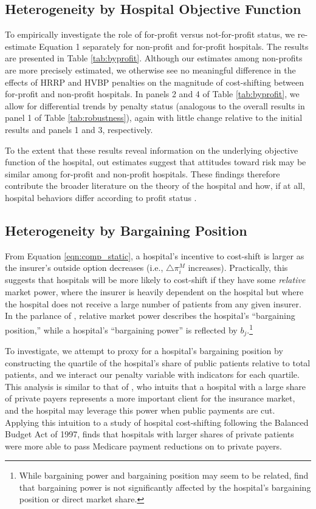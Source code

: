 \documentclass[12pt]{article}
\begin{document}
\subsection{Heterogeneity by Hospital Objective Function}
To empirically investigate the role of for-profit versus not-for-profit status, we re-estimate Equation 1 separately for non-profit and for-profit hospitals.  The results are presented in Table \ref{tab:byprofit}. Although our estimates among non-profits are more precisely estimated, we otherwise see no meaningful difference in the effects of HRRP and HVBP penalties on the magnitude of cost-shifting between for-profit and non-profit hospitals. In panels 2 and 4 of Table \ref{tab:byprofit}, we allow for differential trends by penalty status (analogous to the overall results in panel 1 of Table \ref{tab:robustness}), again with little change relative to the initial results and panels 1 and 3, respectively.

To the extent that these results reveal information on the underlying objective function of the hospital, out estimates suggest that attitudes toward risk may be similar among for-profit and non-profit hospitals. These findings therefore contribute the broader literature on the theory of the hospital and how, if at all, hospital behaviors differ according to profit status \citep{sloan2001,duggan2002,horwitz2005,horwitz2009,david2009}.

\subsection{Heterogeneity by Bargaining Position}
From Equation \ref{eqn:comp_static}, a hospital's incentive to cost-shift is larger as the insurer's outside option decreases (i.e., $\triangle \pi_{i}^{M}$ increases). Practically, this suggests that hospitals will be more likely to cost-shift if they have some \textit{relative} market power, where the insurer is heavily dependent on the hospital but where the hospital does not receive a large number of patients from any given insurer. In the parlance of \cite{lewis2015}, relative market power describes the hospital's ``bargaining position,'' while a hospital's ``bargaining power'' is reflected by $b_{j}$.\footnote{While bargaining power and bargaining position may seem to be related, \cite{lewis2015} find that bargaining power is not significantly affected by the hospital's bargaining position or direct market share.}

To investigate, we attempt to proxy for a hospital's bargaining position by constructing the quartile of the hospital's share of public patients relative to total patients, and we interact our penalty variable with indicators for each quartile. This analysis is similar to that of \cite{wu2010}, who intuits that a hospital with a large share of private payers represents a more important client for the insurance market, and the hospital may leverage this power when public payments are cut. Applying this intuition to a study of hospital cost-shifting following the Balanced Budget Act of 1997, \cite{wu2010} finds that hospitals with larger shares of private patients were more able to pass Medicare payment reductions on to private payers.
\end{document}
